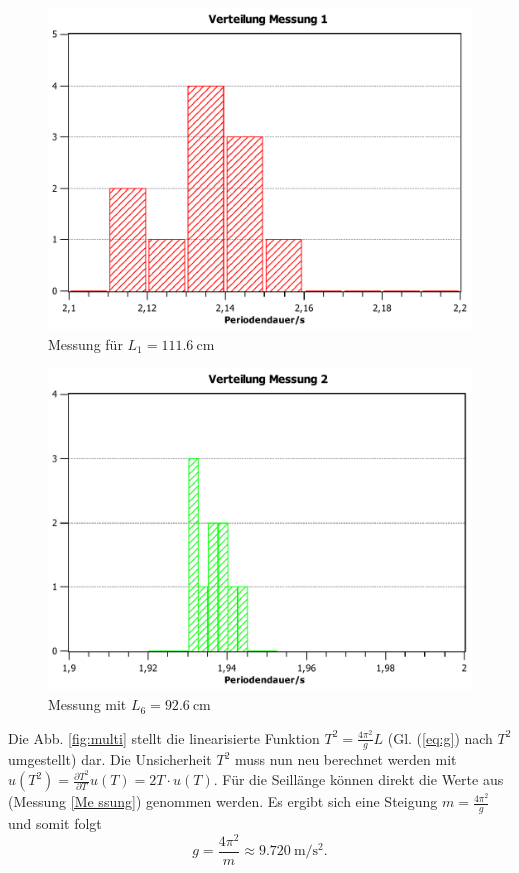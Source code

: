 \documentclass[11pt,a4paper,titlepage, ngerman]{article}
\begin{document}
		\begin{figure}[ht]
			\centering
			\includegraphics[width=\textwidth]{VerteilungMessung1.pdf}
			\caption{Messung für $L_1 = \SI{111,6}{\centi\meter}$}
			\label{fig:Hist1}
		\end{figure}
		\begin{figure}[ht]
			\centering
			\includegraphics[width=\textwidth]{VerteilungMessung2.pdf}
			\caption{Messung mit $L_6 = \SI{92,6}{\centi\meter}$}
			\label{fig:Hist2}
		\end{figure}
			
		Die Abb. \ref{fig:multi} stellt die linearisierte Funktion $T^2 = \frac{4 \pi^2}{g} L$ (Gl. (\ref{eq:g}) nach $T^2$ umgestellt) dar.
		Die Unsicherheit $T^2$ muss nun neu berechnet werden mit $u(T^2) = \frac{\partial T^2}{\partial T} u(T) = 2 T \cdot u(T)$.
		Für die Seillänge können direkt die Werte aus (Messung \ref{Me	ssung}) genommen werden.
		Es ergibt sich eine Steigung $m = \frac{4 \pi^2}{g}$ und somit folgt
		\begin{equation}
			g = \frac{4 \pi^2}{m} \approx \SI{9,720}{\meter\per\second\squared}.
		\end{equation}
			
\end{document}

